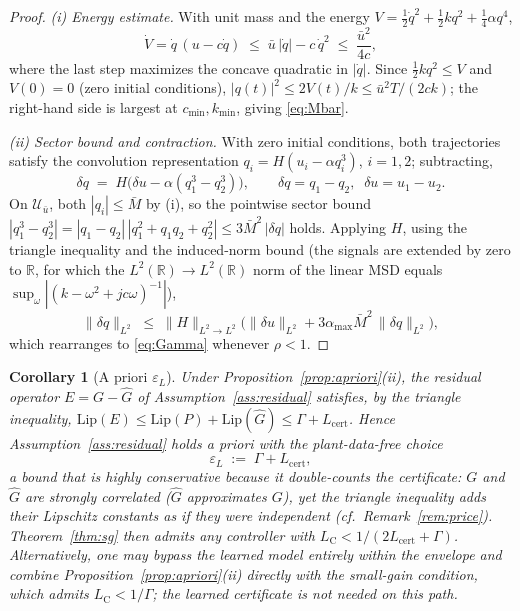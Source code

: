 \documentclass[11pt]{article}
\newtheorem{corollary}{Corollary}
\newcommand{\Ltwo}{L^2}
\newcommand{\Ghat}{\hat{G}}
\newcommand{\Lhat}{L_{\mathrm{cert}}}
\newcommand{\epsL}{\varepsilon_L}
\newcommand{\LC}{L_{\mathrm{C}}}
\begin{document}
\begin{proof}
\emph{(i) Energy estimate.} With unit mass and the energy
$V=\tfrac12\dot q^2+\tfrac12kq^2+\tfrac14\alpha q^4$,
\begin{equation}
  \dot V = \dot q\,(u-c\dot q) \;\le\; \bar u\,|\dot q| - c\,\dot q^2
  \;\le\; \frac{\bar u^2}{4c},
\end{equation}
where the last step maximizes the concave quadratic in $|\dot q|$. Since
$\tfrac12 kq^2\le V$ and $V(0)=0$ (zero initial conditions),
$|q(t)|^2\le 2V(t)/k \le \bar u^2T/(2ck)$; the right-hand side is largest
at $c_{\min},k_{\min}$, giving \eqref{eq:Mbar}.

\emph{(ii) Sector bound and contraction.} With zero initial conditions,
both trajectories satisfy the convolution representation
$q_i=H(u_i-\alpha q_i^3)$, $i=1,2$; subtracting,
\begin{equation}
  \delta q \;=\; H\big(\delta u-\alpha(q_1^3-q_2^3)\big),
  \qquad \delta q = q_1-q_2,\;\; \delta u = u_1-u_2 .
\end{equation}
On $\mathcal{U}_{\bar u}$, both $|q_i|\le\bar M$ by (i), so the pointwise
sector bound
$|q_1^3-q_2^3|=|q_1-q_2|\,|q_1^2+q_1q_2+q_2^2|\le 3\bar M^2\,|\delta q|$
holds. Applying $H$, using the triangle inequality and the induced-norm
bound (the signals are extended by zero to $\mathbb{R}$, for which the
$\Ltwo(\mathbb{R})\to\Ltwo(\mathbb{R})$ norm of the linear MSD equals
$\sup_\omega|(k-\omega^2+jc\omega)^{-1}|$),
\begin{equation}
  \|\delta q\|_{\Ltwo}
  \;\le\; \|H\|_{\Ltwo\to\Ltwo}\big(\|\delta u\|_{\Ltwo}
  + 3\alpha_{\max}\bar M^2\,\|\delta q\|_{\Ltwo}\big),
\end{equation}
which rearranges to \eqref{eq:Gamma} whenever $\rho<1$.
\end{proof}

\begin{corollary}[A priori $\epsL$]\label{cor:apriori}
Under Proposition~\ref{prop:apriori}(ii), the residual operator
$E=G-\Ghat$ of Assumption~\ref{ass:residual} satisfies, by the triangle
inequality,
$\mathrm{Lip}(E)\le\mathrm{Lip}(P)+\mathrm{Lip}(\Ghat)\le\Gamma+\Lhat$.
Hence Assumption~\ref{ass:residual} holds \emph{a priori} with the
plant-data-free choice
\begin{equation}
  \epsL \;:=\; \Gamma + \Lhat ,
  \label{eq:epsL-apriori}
\end{equation}
a bound that is \emph{highly conservative} because it double-counts the
certificate: $G$ and $\Ghat$ are strongly correlated ($\Ghat$ approximates
$G$), yet the triangle inequality adds their Lipschitz constants as if
they were independent (cf.\ Remark~\ref{rem:price}).
Theorem~\ref{thm:sg} then admits any controller with
$\LC<1/(2\Lhat+\Gamma)$. Alternatively, one may bypass the learned model
entirely within the envelope and combine
Proposition~\ref{prop:apriori}(ii) directly with the small-gain condition,
which admits $\LC<1/\Gamma$; the learned certificate is not needed on this
path.
\end{corollary}
\end{document}
